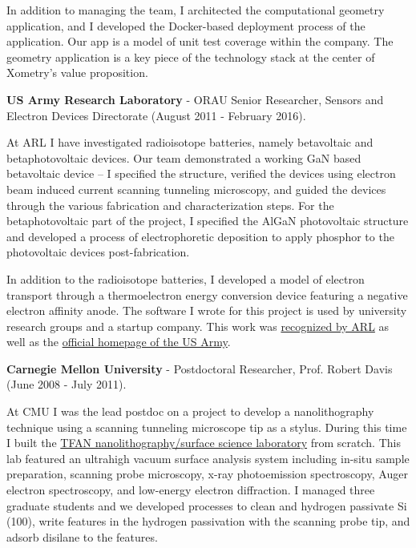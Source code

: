 In addition to managing the team, I architected the computational
geometry application, and I developed the Docker-based deployment
process of the application. Our app is a model of unit test coverage
within the company. The geometry application is a key piece of the
technology stack at the center of Xometry's value proposition.

\textbf{US Army Research Laboratory} - ORAU Senior Researcher, Sensors
and Electron Devices Directorate (August 2011 - February 2016).

At ARL I have investigated radioisotope batteries, namely betavoltaic
and betaphotovoltaic devices. Our team demonstrated a working GaN based
betavoltaic device -- I specified the structure, verified the devices
using electron beam induced current scanning tunneling microscopy, and
guided the devices through the various fabrication and characterization
steps. For the betaphotovoltaic part of the project, I specified the
AlGaN photovoltaic structure and developed a process of electrophoretic
deposition to apply phosphor to the photovoltaic devices
post-fabrication.

In addition to the radioisotope batteries, I developed a model of
electron transport through a thermoelectron energy conversion device
featuring a negative electron affinity anode. The software I wrote for
this project is used by university research groups and a startup
company. This work was
\href{http://www.arl.army.mil/www/default.cfm?article=2462}{recognized
by ARL} as well as the
\href{http://www.army.mil/article/123473/Visiting_Army_scientist_makes_discoveries_in_emerging_technology/}{official
homepage of the US Army}.

\textbf{Carnegie Mellon University} - Postdoctoral Researcher, Prof.
Robert Davis (June 2008 - July 2011).

At CMU I was the lead postdoc on a project to develop a nanolithography
technique using a scanning tunneling microscope tip as a stylus. During
this time I built the \href{https://www.flickr.com/groups/tfan/}{TFAN
nanolithography/surface science laboratory} from scratch. This lab
featured an ultrahigh vacuum surface analysis system including in-situ
sample preparation, scanning probe microscopy, x-ray photoemission
spectroscopy, Auger electron spectroscopy, and low-energy electron
diffraction. I managed three graduate students and we developed
processes to clean and hydrogen passivate Si (100), write features in
the hydrogen passivation with the scanning probe tip, and adsorb
disilane to the features.

